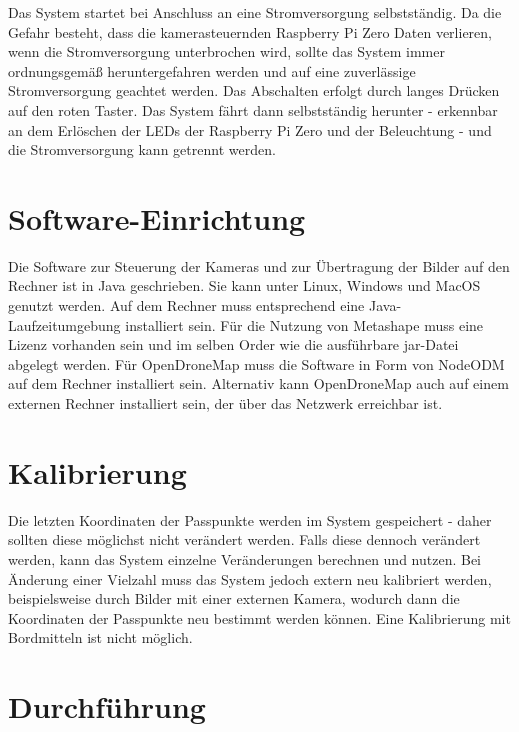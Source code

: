 \documentclass[./00PhotoBox.tex]{subfiles}
\begin{document}
Das System startet bei Anschluss an eine Stromversorgung selbstständig. Da die Gefahr besteht, dass die kamerasteuernden Raspberry Pi Zero Daten verlieren, wenn die Stromversorgung unterbrochen wird, sollte das System immer ordnungsgemäß heruntergefahren werden und auf eine zuverlässige Stromversorgung geachtet werden.
Das Abschalten erfolgt durch langes Drücken auf den roten Taster. Das System fährt dann selbstständig herunter - erkennbar an dem Erlöschen der LEDs der Raspberry Pi Zero und der Beleuchtung - und die Stromversorgung kann getrennt werden.

\section{Software-Einrichtung}
\label{sec:SoftwareEinrichtung}
Die Software zur Steuerung der Kameras und zur Übertragung der Bilder auf den Rechner ist in Java geschrieben. Sie kann unter Linux, Windows und MacOS genutzt werden. Auf dem Rechner muss entsprechend eine Java-Laufzeitumgebung installiert sein. Für die Nutzung von Metashape muss eine Lizenz vorhanden sein und im selben Order wie die ausführbare jar-Datei abgelegt werden. Für OpenDroneMap muss die Software in Form von NodeODM auf dem Rechner installiert sein. Alternativ kann OpenDroneMap auch auf einem externen Rechner installiert sein, der über das Netzwerk erreichbar ist.

\section{Kalibrierung}
Die letzten Koordinaten der Passpunkte werden im System gespeichert - daher sollten diese möglichst nicht verändert werden. Falls diese dennoch verändert werden, kann das System einzelne Veränderungen berechnen und nutzen. Bei Änderung einer Vielzahl muss das System jedoch extern neu kalibriert werden, beispielsweise durch Bilder mit einer externen Kamera, wodurch dann die Koordinaten der Passpunkte neu bestimmt werden können. Eine Kalibrierung mit Bordmitteln ist nicht möglich.

\section{Durchführung}
\end{document}
